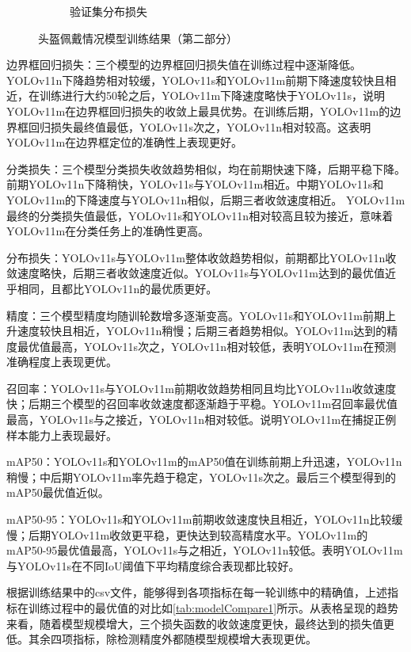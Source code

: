\begin{figure}[H]
\begin{subfigure}[t]{0.43\textwidth}
        \caption{验证集分布损失}
        \label{fig:helmet_val_dfl_loss}
    \end{subfigure}
    \caption{头盔佩戴情况模型训练结果（第二部分）}
    \label{fig:helmetResult_part2}
\end{figure}

边界框回归损失：三个模型的边界框回归损失值在训练过程中逐渐降低。YOLOv11n下降趋势相对较缓，YOLOv11s和YOLOv11m前期下降速度较快且相近，在训练进行大约50轮之后，YOLOv11m下降速度略快于YOLOv11s，说明YOLOv11m在边界框回归损失的收敛上最具优势。在训练后期，YOLOv11m的边界框回归损失最终值最低，YOLOv11s次之，YOLOv11n相对较高。这表明YOLOv11m在边界框定位的准确性上表现更好。

分类损失：三个模型分类损失收敛趋势相似，均在前期快速下降，后期平稳下降。前期YOLOv11n下降稍快，YOLOv11s与YOLOv11m相近。中期YOLOv11s和YOLOv11m的下降速度与YOLOv11n相似，后期三者收敛速度相近。
YOLOv11m最终的分类损失值最低，YOLOv11s和YOLOv11n相对较高且较为接近，意味着YOLOv11m在分类任务上的准确性更高。

分布损失：YOLOv11s与YOLOv11m整体收敛趋势相似，前期都比YOLOv11n收敛速度略快，后期三者收敛速度近似。YOLOv11s与YOLOv11m达到的最优值近乎相同，且都比YOLOv11n的最优质更好。

精度：三个模型精度均随训轮数增多逐渐变高。YOLOv11s和YOLOv11m前期上升速度较快且相近，YOLOv11n稍慢；后期三者趋势相似。YOLOv11m达到的精度最优值最高，YOLOv11s次之，YOLOv11n相对较低，表明YOLOv11m在预测准确程度上表现更优。

召回率：YOLOv11s与YOLOv11m前期收敛趋势相同且均比YOLOv11n收敛速度快；后期三个模型的召回率收敛速度都逐渐趋于平稳。YOLOv11m召回率最优值最高，YOLOv11s与之接近，YOLOv11n相对较低。说明YOLOv11m在捕捉正例样本能力上表现最好。

mAP50：YOLOv11s和YOLOv11m的mAP50值在训练前期上升迅速，YOLOv11n稍慢；中后期YOLOv11m率先趋于稳定，YOLOv11s次之。最后三个模型得到的mAP50最优值近似。

mAP50-95：YOLOv11s和YOLOv11m前期收敛速度快且相近，YOLOv11n比较缓慢；后期YOLOv11m收敛更平稳，更快达到较高精度水平。YOLOv11m的mAP50-95最优值最高，YOLOv11s与之相近，YOLOv11n较低。表明YOLOv11m与YOLOv11s在不同IoU阈值下平均精度综合表现都比较好。

根据训练结果中的csv文件，能够得到各项指标在每一轮训练中的精确值，上述指标在训练过程中的最优值的对比如\ref{tab:modelCompare1}所示。从表格呈现的趋势来看，随着模型规模增大，三个损失函数的收敛速度更快，最终达到的损失值更低。其余四项指标，除检测精度外都随模型规模增大表现更优。

